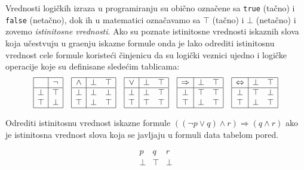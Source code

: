 Vrednosti logi\v ckih izraza u programiranju su obi\v cno ozna\v cene sa \verb`true` (ta\v cno) i \verb`false` (neta\v cno), dok ih
u matematici ozna\v cavamo sa $\top$ (ta\v cno) i $\bot$ (neta\v cno) i zovemo \emph{istinitosne vrednosti}.
Ako su poznate istinitosne vrednosti iskaznih slova koja u\v cestvuju u gra\dj enju iskazne formule
onda je lako odrediti istinitosnu vrednost cele formule
koriste\'ci \v cinjenicu da su logi\v cki veznici ujedno i logi\v cke operacije koje su definisane slede\'cim tablicama:
$$
  \begin{array}{ccccc}
    \begin{array}{|c|c|}
    \hline
        & \lnot \\
    \hline
    \bot & \top \\
    \top & \bot \\
    \hline
    \end{array}
  &
    \begin{array}{|c|cc|}
    \hline
    \land & \bot & \top \\
    \hline
    \bot & \bot & \bot \\
    \top & \bot & \top \\
    \hline
    \end{array}
  &
    \begin{array}{|c|cc|}
    \hline
    \lor  & \bot & \top \\
    \hline
    \bot & \bot & \top \\
    \top & \top & \top \\
    \hline
    \end{array}
  &
    \begin{array}{|c|cc|}
    \hline
    \Rightarrow  & \bot & \top \\
    \hline
    \bot & \top & \top \\
    \top & \bot & \top \\
    \hline
    \end{array}
  &
    \begin{array}{|c|cc|}
    \hline
    \Leftrightarrow  & \bot & \top \\
    \hline
    \bot & \top & \bot \\
    \top & \bot & \top \\
    \hline
    \end{array}
  \end{array}
$$

\medskip

\noindent
\begin{minipage}{3.5in}
  \begin{EX}
    Odrediti istinitosnu vrednost iskazne formule $((\lnot p \lor q) \land r) \Rightarrow (q \land r)$
    ako je istinitosna vrednost slova koja se javljaju u formuli data tabelom pored.
  \end{EX}
\end{minipage}\hfill
\begin{minipage}{1.5in}
  $$
    \begin{array}{ccc}
    p & q & r \\
    \hline
    \bot & \top & \bot
    \end{array}
  $$
\end{minipage}\par

